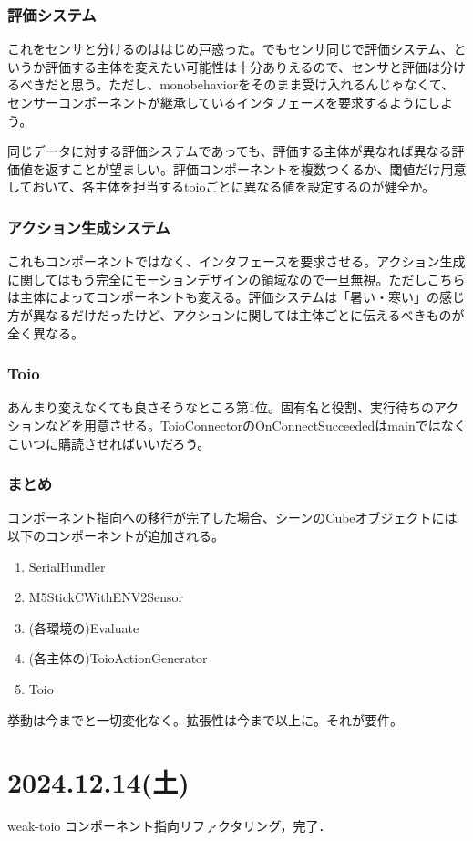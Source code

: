 \documentclass[fleqn,twocolumn]{mynote}
\begin{document}
  \subsubsection*{評価システム}
  これをセンサと分けるのははじめ戸惑った。でもセンサ同じで評価システム、というか評価する主体を変えたい可能性は十分ありえるので、センサと評価は分けるべきだと思う。ただし、monobehaviorをそのまま受け入れるんじゃなくて、センサーコンポーネントが継承しているインタフェースを要求するようにしよう。

  同じデータに対する評価システムであっても、評価する主体が異なれば異なる評価値を返すことが望ましい。評価コンポーネントを複数つくるか、閾値だけ用意しておいて、各主体を担当するtoioごとに異なる値を設定するのが健全か。

  \subsubsection*{アクション生成システム}
  これもコンポーネントではなく、インタフェースを要求させる。アクション生成に関してはもう完全にモーションデザインの領域なので一旦無視。ただしこちらは主体によってコンポーネントも変える。評価システムは「暑い・寒い」の感じ方が異なるだけだったけど、アクションに関しては主体ごとに伝えるべきものが全く異なる。

  \subsubsection*{Toio}
  あんまり変えなくても良さそうなところ第1位。固有名と役割、実行待ちのアクションなどを用意させる。ToioConnectorのOnConnectSucceededはmainではなくこいつに購読させればいいだろう。
  \subsubsection*{まとめ}
  コンポーネント指向への移行が完了した場合、シーンのCubeオブジェクトには以下のコンポーネントが追加される。
  \begin{enumerate}
    \item SerialHundler
    \item M5StickCWithENV2Sensor
    \item (各環境の)Evaluate
    \item (各主体の)ToioActionGenerator
    \item Toio
  \end{enumerate}

  挙動は今までと一切変化なく。拡張性は今まで以上に。それが要件。

  \section*{2024.12.14(土)}
  weak-toio コンポーネント指向リファクタリング，完了．
\end{document}
